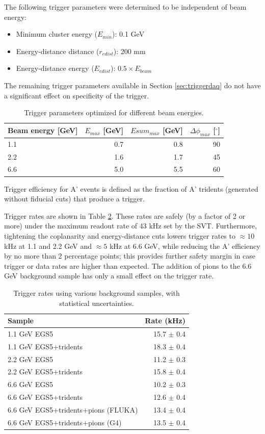 The following trigger parameters were determined to be independent of beam energy:
\begin{itemize}
	\item Minimum cluster energy ($E_{min}$): 0.1 GeV
	\item Energy-distance distance ($r_{edist}$): 200 mm
	\item Energy-distance energy ($E_{edist}$): $0.5\times E_{beam}$
\end{itemize}

The remaining trigger parameters available in Section \ref{sec:triggerdaq} do not have a significant effect on specificity of the trigger.

\begin{table}
	\begin{tabular}{|l|r|r|r|}
		\hline
		Beam energy [GeV] & $E_{max}$ [GeV] & $Esum_{max}$ [GeV] & $\Delta\phi_{max}$ [$^\circ$] \\
		\hline
		1.1	&	0.7	&	0.8	&	90\\
		2.2	&	1.6	&	1.7	&	45\\
		6.6	&	5.0	&	5.5	&	60\\
		\hline
	\end{tabular}
	\caption{ {\small Trigger parameters optimized for different beam energies.}
	\label{tab:trigcuts}}
\end{table}

Trigger efficiency for A' events is defined as the fraction of A' tridents (generated without fiducial cuts) that produce a trigger.

Trigger rates are shown in Table \ref{tab:trigrates}. These rates are safely (by a factor of 2 or more) under the maximum readout rate of 43 kHz set by the SVT. 
Furthermore, tightening the coplanarity and energy-distance cuts lowers trigger rates to $\approx 10$ kHz at 1.1 and 2.2 GeV and $\approx 5$ kHz at 6.6 GeV, while reducing the A' efficiency by no more than 2 percentage points; this provides further safety margin in case trigger or data rates are higher than expected.
The addition of pions to the 6.6 GeV background sample has only a small effect on the trigger rate.

\begin{table}
	\begin{tabular}{|l|r|}
		\hline
		Sample &  Rate (kHz)\\
		\hline
		1.1 GeV	EGS5 				& 15.7 $\pm$ 0.4	\\
		1.1 GeV EGS5+tridents			& 18.3 $\pm$ 0.4	\\
		2.2 GeV	EGS5 				& 11.2 $\pm$ 0.3	\\
		2.2 GeV EGS5+tridents			& 15.8 $\pm$ 0.4	\\
		6.6 GeV	EGS5 				& 10.2 $\pm$ 0.3	\\
		6.6 GeV EGS5+tridents			& 12.6 $\pm$ 0.4	\\
		6.6 GeV EGS5+tridents+pions (FLUKA)	& 13.4 $\pm$ 0.4	\\
		6.6 GeV EGS5+tridents+pions (G4)	& 13.5 $\pm$ 0.4	\\
		\hline
	\end{tabular}
	\caption{ {\small Trigger rates using various background samples, with statistical uncertainties. }
	\label{tab:trigrates}}
\end{table}

